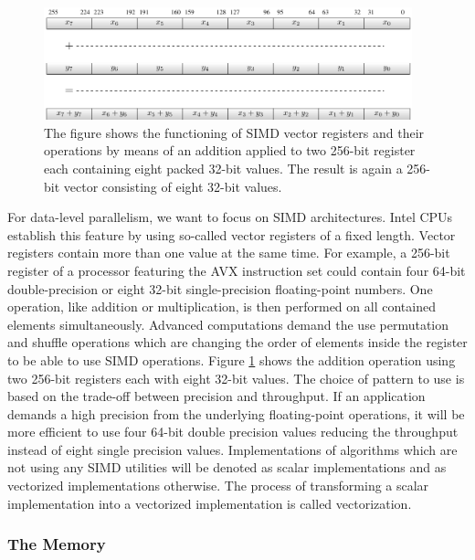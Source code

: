 \documentclass{stdlocal}
\begin{document}
    \begin{figure}
      \center
      \includegraphics[width=0.95\textwidth]{figures/simd_vector_operations.pdf}
      \caption[SIMD Vector Registers and Operations]{%
        The figure shows the functioning of SIMD vector registers and their operations by means of an addition applied to two 256-bit register each containing eight packed 32-bit values.
        The result is again a 256-bit vector consisting of eight 32-bit values.
      }
      \label{fig:simd-vector-operation}
    \end{figure}

    For data-level parallelism, we want to focus on SIMD architectures.
    Intel CPUs establish this feature by using so-called vector registers of a fixed length.
    Vector registers contain more than one value at the same time.
    For example, a 256-bit register of a processor featuring the AVX instruction set could contain four 64-bit double-precision or eight 32-bit single-precision floating-point numbers.
    One operation, like addition or multiplication, is then performed on all contained elements simultaneously.
    Advanced computations demand the use permutation and shuffle operations which are changing the order of elements inside the register to be able to use SIMD operations.
    Figure \ref{fig:simd-vector-operation} shows the addition operation using two 256-bit registers each with eight 32-bit values.
    The choice of pattern to use is based on the trade-off between precision and throughput.
    If an application demands a high precision from the underlying floating-point operations, it will be more efficient to use four 64-bit double precision values reducing the throughput instead of eight single precision values.
    Implementations of algorithms which are not using any SIMD utilities will be denoted as scalar implementations and as vectorized implementations otherwise.
    The process of transforming a scalar implementation into a vectorized implementation is called vectorization.
    \autocite{intel-optimization-reference,fog2019a,fog2019d,dolbeau2016}

    \subsubsection*{The Memory}
\end{document}
